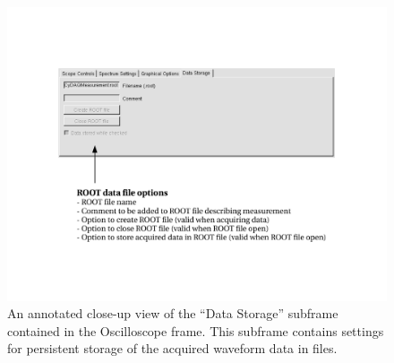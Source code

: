 \begin{figure}
  \centering
  \includegraphics[width=6in]{images/OscilloscopeData}
  \caption{An annotated close-up view of the ``Data Storage'' subframe
    contained in the Oscilloscope frame. This subframe contains settings
    for persistent storage of the acquired waveform data in \ROOT
    files.}
  \label{fig:datasubframe}
\end{figure}

